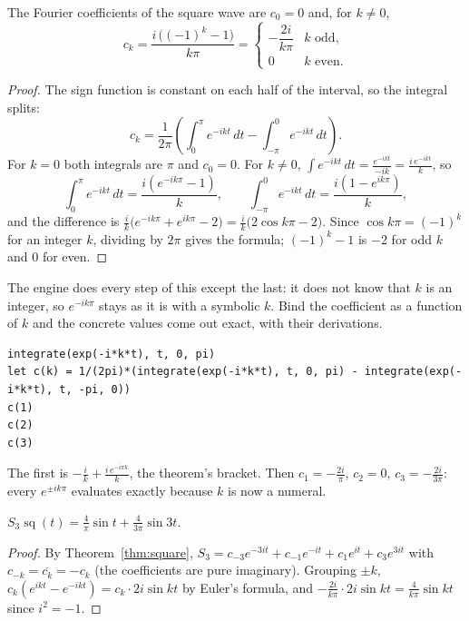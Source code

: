 \begin{theorem}\label{thm:square}
  The Fourier coefficients of the square wave are $c_0 = 0$ and, for $k \neq 0$,
  \[
    c_k = \frac{i\,\big((-1)^k - 1\big)}{k\pi} =
    \begin{cases} -\dfrac{2i}{k\pi} & k \text{ odd}, \\[6pt] 0 & k \text{ even}. \end{cases}
  \]
\end{theorem}
\begin{proof}
  The sign function is constant on each half of the interval, so the integral splits:
  \[
    c_k = \frac{1}{2\pi}\left(\int_0^{\pi} e^{-ikt}\,dt - \int_{-\pi}^{0} e^{-ikt}\,dt\right).
  \]
  For $k = 0$ both integrals are $\pi$ and $c_0 = 0$. For $k \neq 0$, $\int e^{-ikt}\,dt =
  \frac{e^{-ikt}}{-ik} = \frac{i\,e^{-ikt}}{k}$, so
  \[
    \int_0^{\pi} e^{-ikt}\,dt = \frac{i(e^{-ik\pi} - 1)}{k}, \qquad
    \int_{-\pi}^{0} e^{-ikt}\,dt = \frac{i(1 - e^{ik\pi})}{k},
  \]
  and the difference is $\frac{i}{k}\big(e^{-ik\pi} + e^{ik\pi} - 2\big) = \frac{i}{k}\big(2\cos
  k\pi - 2\big)$. Since $\cos k\pi = (-1)^k$ for an integer $k$, dividing by $2\pi$ gives the
  formula; $(-1)^k - 1$ is $-2$ for odd $k$ and $0$ for even.
\end{proof}

The engine does every step of this except the last: it does not know that $k$ is an integer, so
$e^{-ik\pi}$ stays as it is with a symbolic $k$. Bind the coefficient as a function of $k$ and
the concrete values come out exact, with their derivations.

\begin{trybox}
\begin{verbatim}
integrate(exp(-i*k*t), t, 0, pi)
let c(k) = 1/(2pi)*(integrate(exp(-i*k*t), t, 0, pi) - integrate(exp(-i*k*t), t, -pi, 0))
c(1)
c(2)
c(3)
\end{verbatim}
  The first is $-\frac{i}{k} + \frac{i\,e^{-i\pi k}}{k}$, the theorem's bracket. Then $c_1 =
  -\frac{2i}{\pi}$, $c_2 = 0$, $c_3 = -\frac{2i}{3\pi}$: every $e^{\pm ik\pi}$ evaluates exactly
  because $k$ is now a numeral.
\end{trybox}

\begin{theorem}
  $S_3\operatorname{sq}(t) = \frac{4}{\pi}\sin t + \frac{4}{3\pi}\sin 3t$.
\end{theorem}
\begin{proof}
  By Theorem~\ref{thm:square}, $S_3 = c_{-3}e^{-3it} + c_{-1}e^{-it} + c_1 e^{it} + c_3 e^{3it}$
  with $c_{-k} = \overline{c_k} = -c_k$ (the coefficients are pure imaginary). Grouping $\pm k$,
  $c_k(e^{ikt} - e^{-ikt}) = c_k \cdot 2i\sin kt$ by Euler's formula, and $-\frac{2i}{k\pi} \cdot
  2i \sin kt = \frac{4}{k\pi}\sin kt$ since $i^2 = -1$.
\end{proof}

